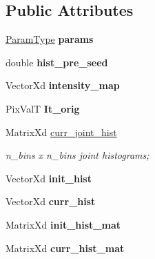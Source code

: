 \subsection*{Public Attributes}
\begin{DoxyCompactItemize}
\item 
\hypertarget{classRSCV_a2cc60c446a1cebcecba529ba800c4c80}{\hyperlink{structRSCVParams}{Param\-Type} {\bfseries params}}\label{classRSCV_a2cc60c446a1cebcecba529ba800c4c80}

\item 
\hypertarget{classRSCV_adee1690d66508ec889f752124f82887f}{double {\bfseries hist\-\_\-pre\-\_\-seed}}\label{classRSCV_adee1690d66508ec889f752124f82887f}

\item 
\hypertarget{classRSCV_a8d2f412bec4ed07818a7b61820edbf3a}{Vector\-Xd {\bfseries intensity\-\_\-map}}\label{classRSCV_a8d2f412bec4ed07818a7b61820edbf3a}

\item 
\hypertarget{classRSCV_a8e41e24d79ef334fd75aca0941fd9c01}{Pix\-Val\-T {\bfseries It\-\_\-orig}}\label{classRSCV_a8e41e24d79ef334fd75aca0941fd9c01}

\item 
\hypertarget{classRSCV_a844f72eff0da14c92ab0768f6b44d078}{Matrix\-Xd \hyperlink{classRSCV_a844f72eff0da14c92ab0768f6b44d078}{curr\-\_\-joint\-\_\-hist}}\label{classRSCV_a844f72eff0da14c92ab0768f6b44d078}

\begin{DoxyCompactList}\small\item\em n\-\_\-bins x n\-\_\-bins joint histograms; \end{DoxyCompactList}\item 
\hypertarget{classRSCV_aaa1a7b6f9e70fd240c770e809b2234f1}{Vector\-Xd {\bfseries init\-\_\-hist}}\label{classRSCV_aaa1a7b6f9e70fd240c770e809b2234f1}

\item 
\hypertarget{classRSCV_a08fb634716aaf08ee10d524e4d418776}{Vector\-Xd {\bfseries curr\-\_\-hist}}\label{classRSCV_a08fb634716aaf08ee10d524e4d418776}

\item 
\hypertarget{classRSCV_ae4755532f7599f143b7f8ac11564f39e}{Matrix\-Xd {\bfseries init\-\_\-hist\-\_\-mat}}\label{classRSCV_ae4755532f7599f143b7f8ac11564f39e}

\item 
\hypertarget{classRSCV_a3efc4ddd6dbc08b76d4e483d36982838}{Matrix\-Xd {\bfseries curr\-\_\-hist\-\_\-mat}}\label{classRSCV_a3efc4ddd6dbc08b76d4e483d36982838}

\end{DoxyCompactItemize}
